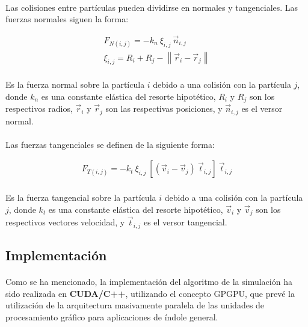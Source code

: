 \documentclass[12pt, twocolumn]{article}
\begin{document}
	\paragraph{} Las colisiones entre partículas pueden dividirse en normales y tangenciales. Las fuerzas normales siguen la forma:
	
	\begin{align}
	   F_{N(i,j)} = -k_{n}\:\xi_{i,j}\:\Vec{n}_{i,j} \\
	   \xi_{i,j} = R_{i} + R_{j} - \left\lVert\Vec{r}_i-\Vec{r}_j  \right\rVert
	\end{align}
	
	\paragraph{} Es la fuerza normal sobre la partícula $i$ debido a una colisión con la partícula $j$, donde $k_{n}$ es una constante elástica del resorte hipotético, $R_{i}$ y $R_{j}$ son los respectivos radios, $\Vec{r}_{i}$ y $\Vec{r}_{j}$ son las respectivas posiciones, y $\Vec{n}_{i,j}$ es el versor normal.
	
	\paragraph{} Las fuerzas tangenciales se definen de la siguiente forma:
	
	
	\begin{align}
	   F_{T(i,j)} = -k_{t}\:\xi_{i,j}\:[(\Vec{v}_{i}-\Vec{v}_{j})\:\Vec{t}_{i,j}]\:\Vec{t}_{i,j}
	\end{align}
	
	\paragraph{} Es la fuerza tangencial sobre la partícula $i$ debido a una colisión con la partícula $j$, donde $k_{t}$ es una constante elástica del resorte hipotético, $\Vec{v}_{i}$ y $\Vec{v}_{j}$ son los respectivos vectores velocidad, y $\Vec{t}_{i,j}$ es el versor tangencial.
	
	\subsection{Implementación}
	
	\paragraph{} Como se ha mencionado, la implementación del algoritmo de la simulación ha sido realizada en \textbf{CUDA/C++}, utilizando el concepto GPGPU, que prevé la utilización de la arquitectura masivamente paralela de las unidades de procesamiento gráfico para aplicaciones de índole general.
	
\end{document}
